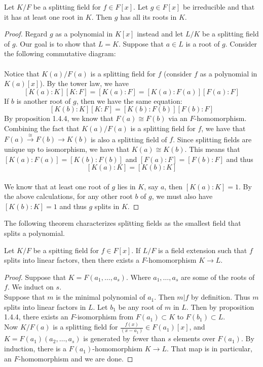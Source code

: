 \documentclass[a4paper]{article}
\begin{document}
\begin{thm}{}{} Let $K/F$ be a splitting field for $f\in F[x]$. Let $g\in F[x]$ be irreducible and that it has at least one root in $K$. Then $g$ has all its roots in $K$. 
\begin{proof}
Regard $g$ as a polynomial in $K[x]$ instead and let $L/K$ be a splitting field of $g$. Our goal is to show that $L=K$. Suppose that $a\in L$ is a root of $g$. Consider the following commutative diagram: \\
\\
Notice that $K(a)/F(a)$ is a splitting field for $f$ (consider $f$ as a polynomial in $K(a)[x]$). By the tower law, we have $$[K(a):K][K:F]=[K(a):F]=[K(a):F(a)][F(a):F]$$ If $b$ is another root of $g$, then we have the same equation: $$[K(b):K][K:F]=[K(b):F(b)][F(b):F]$$ By proposition 1.4.4, we know that $F(a)\cong F(b)$ via an $F$-homomorphism. Combining the fact that $K(a)/F(a)$ is a splitting field for $f$, we have that $F(a)\overset{\cong}{\rightarrow}F(b)\rightarrow K(b)$ is also a splitting field of $f$. Since splitting fields are unique up to isomorphism, we have that $K(a)\cong K(b)$. This means that $[K(a):F(a)]=[K(b):F(b)]$ and $[F(a):F]=[F(b):F]$ and thus $$[K(a):K]=[K(b):K]$$~\\
We know that at least one root of $g$ lies in $K$, say $a$, then $[K(a):K]=1$. By the above calculations, for any other root $b$ of $g$, we must also have $[K(b):K]=1$ and thus $g$ splits in $K$. 
\end{proof}
\end{thm}

The following theorem characterizes splitting fields as the smallest field that splits a polynomial. 

\begin{thm}{}{} Let $K/F$ be a spitting field for $f\in F[x]$. If $L/F$ is a field extension such that $f$ splits into linear factors, then there exists a $F$-homomorphism $K\to L$. 
\begin{proof}
Suppose that $K=F(a_1,\dots,a_s)$. Where $a_1,\dots,a_s$ are some of the roots of $f$. We induct on $s$. \\
Suppose that $m$ is the minimal polynomial of $a_1$. Then $m|f$ by definition. Thus $m$ splits into linear factors in $L$. Let $b_1$ be any root of $m$ in $L$. Then by proposition 1.4.4, there exists an $F$-isomorphism from $F(a_1)\subset K$ to $F(b_1)\subset L$. \\
Now $K/F(a)$ is a splitting field for $\frac{f(x)}{(x-a_1)}\in F(a_1)[x]$, and $K=F(a_1)(a_2,\dots,a_s)$ is generated by fewer than $s$ elements over $F(a_1)$. By induction, there is a $F(a_1)$-homomorphism $K\to L$. That map is in particular, an $F$-homomorphism and we are done. 
\end{proof}
\end{thm}
\end{document}
